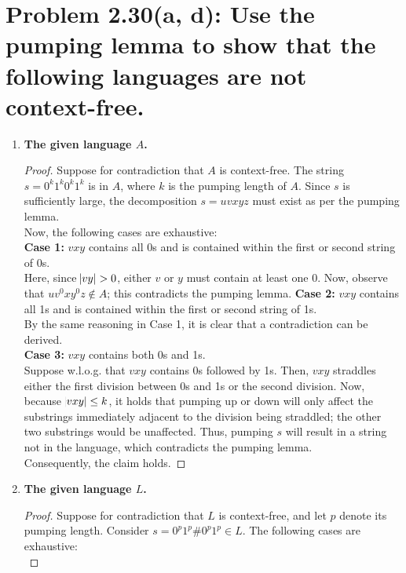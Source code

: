 \documentclass[12pt]{article}
\begin{document}
\section*{Problem 2.30(a, d): Use the pumping lemma to show that the following languages are not context-free.}
\begin{enumerate}
\item \textbf{The given language $A$.}
  \begin{proof}
    Suppose for contradiction that $A$ is context-free. The string $s = 0^{k}1^{k}0^{k}1^{k}$ is in $A$, where $k$ is the pumping length of $A$. Since $s$ is sufficiently large, the decomposition $s = uvxyz$ must exist as per the pumping lemma. \\
    \newline
    Now, the following cases are exhaustive: \\
    \newline
    \textbf{Case 1:} $vxy$ contains all 0s and is contained within the first or second string of 0s. \\
    \newline
    Here, since $\abs{vy} > 0$, either $v$ or $y$ must contain at least one 0. Now, observe that $uv^{0}xy^{0}z \notin A$; this contradicts the pumping lemma.
    \textbf{Case 2:} $vxy$ contains all 1s and is contained within the first or second string of 1s. \\
    \newline
    By the same reasoning in Case 1, it is clear that a contradiction can be derived. \\
    \newline
    \textbf{Case 3:} $vxy$ contains both 0s and 1s. \\
    \newline
    Suppose w.l.o.g. that $vxy$ contains 0s followed by 1s. Then, $vxy$ straddles either the first division between 0s and 1s or the second division. Now, because $\abs{vxy} \leq k$, it holds that pumping up or down will only affect the substrings immediately adjacent to the division being straddled; the other two substrings would be unaffected. Thus, pumping $s$ will result in a string not in the language, which contradicts the pumping lemma. \\
    \newline
    Consequently, the claim holds.
  \end{proof}
\item \textbf{The given language $L$.}
  \begin{proof}
    Suppose for contradiction that $L$ is context-free, and let $p$ denote its pumping length. Consider $s = 0^{p}1^{p}\#0^{p}1^{p} \in L$. The following cases are exhaustive: \\

\end{proof}
\end{enumerate}
\end{document}

